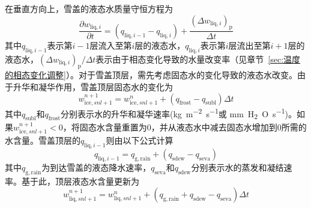 在垂直方向上，雪盖的液态水质量守恒方程为
\begin{equation}
  \frac{\partial w_{\mathrm{liq},i}}{\partial t}=\left(q_{\mathrm{liq},i-1}-q_{\mathrm{liq},i}\right)+\frac{{\left(\Delta w_{\mathrm{liq},i}\right)}_{\mathrm {p}} }{\Delta t}
\end{equation}
其中$q_{\mathrm{liq},i-1}$表示第$i-1$层流入至第$i$层的液态水，$q_{\mathrm{liq},i}$表示第$i$层流出至第$i+1$层的液态水，${{\left(\Delta w_{\mathrm{liq},i}\right)}_{\mathrm {p}} }/{\Delta t}$表示由于相态变化导致的水量改变率（见章节~\ref{sec:温度的相态变化调整}）。对于雪盖顶层，需先考虑固态水的变化导致的液态水改变。由于升华和凝华作用，雪盖顶层固态水的变化为
\begin{equation}
  w_{\mathrm{ice},snl+1}^{n+1}=w_{\mathrm{ice},snl+1}^n+\left(q_{\mathrm{frost}}-q_{\mathrm{subl}}\right)\Delta t
\end{equation}
其中$q_{\mathrm{subl}}$和$q_{\mathrm{frost}}$分别表示水的升华和凝华速率(\unit{kg.m^{-2}.s^{-1}}或 \unit{mm.H_2O.s^{-1}})。如果$w_{\mathrm{ice},snl+1}^{n+1}<0$，将固态水含量重置为0，并从液态水中减去固态水增加到0所需的水含量。雪盖顶层的$q_{\mathrm{liq},i-1}$则由以下公式计算
\begin{equation}
  q_{\mathrm{liq},i-1}=q_{\mathrm{g,rain}}+\left(q_{\mathrm{sdew}}-q_{\mathrm{seva}}\right)
\end{equation}
其中$q_{\mathrm{g,rain}}$为到达雪盖的液态降水速率，$q_{\mathrm{seva}}$和$q_{\mathrm{sdew}}$分别表示水的蒸发和凝结速率。基于此，顶层液态水含量更新为
\begin{equation}w_{\mathrm{liq},snl+1}^{n+1}=w_{\mathrm{liq},snl+1}^n+\left(q_{\mathrm{g,rain}}+q_{\mathrm{sdew}}-q_{\mathrm{seva}}\right)\Delta t
\end{equation}


